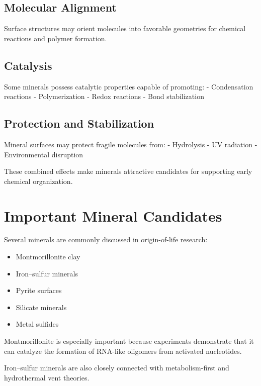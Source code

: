 \documentclass[
  oneside]{book}
\providecommand{\tightlist}{%
  \setlength{\itemsep}{0pt}\setlength{\parskip}{0pt}}
\begin{document}
\subsection{Molecular Alignment}\label{molecular-alignment}

Surface structures may orient molecules into favorable geometries for chemical reactions and polymer formation.

\subsection{Catalysis}\label{catalysis}

Some minerals possess catalytic properties capable of promoting:
- Condensation reactions
- Polymerization
- Redox reactions
- Bond stabilization

\subsection{Protection and Stabilization}\label{protection-and-stabilization}

Mineral surfaces may protect fragile molecules from:
- Hydrolysis
- UV radiation
- Environmental disruption

These combined effects make minerals attractive candidates for supporting early chemical organization.

\section{Important Mineral Candidates}\label{important-mineral-candidates}

Several minerals are commonly discussed in origin-of-life research:

\begin{itemize}
\tightlist
\item
  Montmorillonite clay
\item
  Iron--sulfur minerals
\item
  Pyrite surfaces
\item
  Silicate minerals
\item
  Metal sulfides
\end{itemize}

Montmorillonite is especially important because experiments demonstrate that it can catalyze the formation of RNA-like oligomers from activated nucleotides.

Iron--sulfur minerals are also closely connected with metabolism-first and hydrothermal vent theories.
\end{document}
